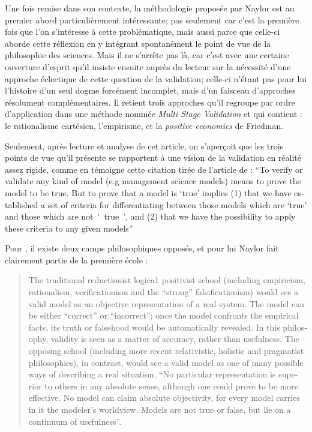 Une fois remise dans son contexte, la méthodologie proposée par Naylor est au premier abord particulièrement intéressante; pas seulement car c'est la première fois que l'on s'intéresse à cette problématique, mais aussi parce que celle-ci aborde cette réflexion en y intégrant spontanément le point de vue de la philosophie des sciences. Mais il ne s'arrête pas là, car c'est avec une certaine ouverture d'esprit qu'il insiste ensuite auprès du lecteur sur la nécessité d'une approche éclectique de cette question de la validation; celle-ci n'étant pas pour lui l'histoire d'un seul dogme forcément incomplet, mais d'un faisceau d'approches résolument complémentaires. Il retient trois approches qu'il regroupe par ordre d'application dans une méthode nommée \textit{Multi Stage Validation} et qui contient : le rationalisme cartésien, l'empirisme, et la \textit{positive economics} de Friedman.

Seulement, après lecture et analyse de cet article, on s'aperçoit que les trois points de vue qu'il présente se rapportent à une vision de la validation en réalité assez rigide, comme en témoigne cette citation tirée de l'article de \textcite{Naylor1967} : \foreignquote{english}{To verify or validate any kind of model (e.g management science models) means to prove the model to be true. But to prove that a model is \enquote{true} implies (1) that we have established a set of criteria for differentiating between those models which are \enquote{true} and those which are not \enquote{ true }, and (2) that we have the possibility to apply these criteria to any given models}

Pour \textcite{Barlas1990, Barlas1996}, il existe deux camps philosophiques opposés, et pour lui Naylor fait clairement partie de la première école : 

\foreignblockquote{english}[\cite{Barlas1990}]{The traditional reductionist logica1 positivist school (including empiricism, rationalism, verificationism and the “strong” falsificationism) would see a valid model as an objective representation of a real system. The model can be either “correct” or “incorrect”; once the model confronts the empirical facts, its truth or falsehood would be automatically revealed. In this philosophy, validity is seen as a matter of accuracy, rather than usefulness. The opposing school (including more recent relativistic, holistic and pragmatist philosophies), in contrast, would see a valid model as one of many possible ways of describing a real situation. \enquote{No particular representation is superior to others in any absolute sense, although one could prove to be more effective. No model can claim absolute objectivity, for every model carries in it the modeler’s worldview. Models are not true or false, but lie on a continuum of usefulness}.}

